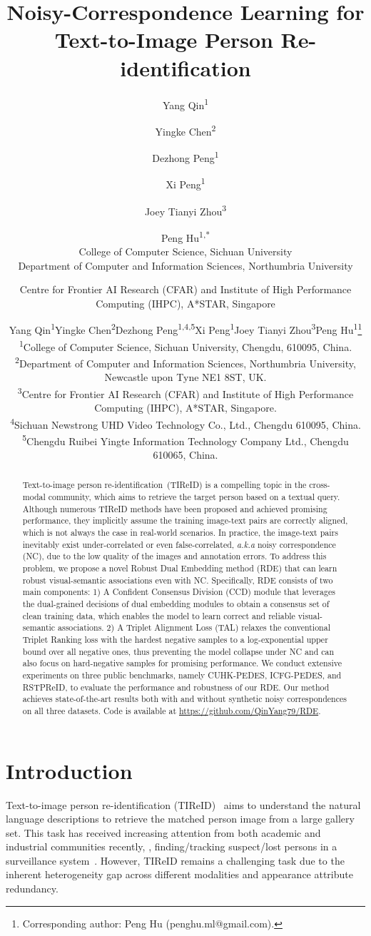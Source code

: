 \documentclass[10pt,twocolumn,letterpaper]{article}
\title{Noisy-Correspondence Learning for Text-to-Image Person Re-identification}
\author{Yang Qin\textsuperscript{\rm 1}\and Yingke Chen\textsuperscript{\rm 2}\and Dezhong Peng\textsuperscript{\rm 1}\and Xi Peng\textsuperscript{\rm 1}\and Joey Tianyi Zhou\textsuperscript{\rm 3}\and Peng Hu\textsuperscript{\rm 1,*}
\\
College of Computer Science, Sichuan University\\
Department of Computer and Information Sciences, Northumbria University\\
\and 
Centre for Frontier AI Research (CFAR) and Institute of High Performance Computing (IHPC), A*STAR, Singapore 
}
\author{
    Yang Qin\textsuperscript{\rm 1}\quad Yingke Chen\textsuperscript{\rm 2}\quad Dezhong Peng\textsuperscript{\rm 1,4,5}\quad Xi Peng\textsuperscript{\rm 1}\quad Joey Tianyi Zhou\textsuperscript{\rm 3}\quad Peng Hu\textsuperscript{\rm 1}\thanks{Corresponding author: Peng Hu (penghu.ml@gmail.com).} \\
    \textsuperscript{\rm 1}{\normalsize College of Computer Science, Sichuan University, Chengdu, 610095,  China.} 
    \\\textsuperscript{\rm 2}{\normalsize Department of Computer and Information Sciences, Northumbria University, Newcastle upon Tyne NE1 8ST, UK.} 
    \\  \textsuperscript{\rm 3}{\normalsize Centre for Frontier AI Research (CFAR) and Institute of High Performance Computing (IHPC), A*STAR, Singapore.}
     \\  \textsuperscript{\rm 4}{\normalsize Sichuan Newstrong UHD Video Technology Co., Ltd., Chengdu 610095, China.}
      \\  \textsuperscript{\rm 5}{\normalsize Chengdu Ruibei Yingte Information Technology Company Ltd., Chengdu 610065, China.}
}
\begin{document}
\maketitle

\begin{abstract}
    Text-to-image person re-identification~(TIReID) is a compelling topic in the cross-modal community, which aims to retrieve the target person based on a textual query. Although numerous TIReID methods have been proposed and achieved promising performance, they implicitly assume the training image-text pairs are correctly aligned, which is not always the case in real-world scenarios. In practice, the image-text pairs inevitably exist under-correlated or even false-correlated, \textit{a.k.a} noisy correspondence (NC), due to the low quality of the images and annotation errors. To address this problem, we propose a novel Robust Dual Embedding method (RDE) that can learn robust visual-semantic associations even with NC. Specifically, RDE consists of two main components: 1) A Confident Consensus Division (CCD) module that leverages the dual-grained decisions of dual embedding modules to obtain a consensus set of clean training data, which enables the model to learn correct and reliable visual-semantic associations. 2) A Triplet Alignment Loss (TAL) relaxes the conventional Triplet Ranking loss with the hardest negative samples to a log-exponential upper bound over all negative ones, thus preventing the model collapse under NC and can also focus on hard-negative samples for promising performance. We conduct extensive experiments on three public benchmarks, namely CUHK-PEDES, ICFG-PEDES, and RSTPReID, to evaluate the performance and robustness of our RDE. Our method achieves state-of-the-art results both with and without synthetic noisy correspondences on all three datasets.  Code is available at \href{https://github.com/QinYang79/RDE}{https://github.com/QinYang79/RDE}.
\end{abstract}


\section{Introduction}
\label{sec:intro}

Text-to-image person re-identification (TIReID)~\cite{li2017person,shu2022see,jiang2023cross} aims to understand the natural language descriptions to retrieve the matched person image from a large gallery set. This task has received increasing attention from both academic and industrial communities recently, \eg, finding/tracking suspect/lost persons in a surveillance system~\cite{wang2015multi,eom2019learning}. However, TIReID remains a challenging task due to the inherent heterogeneity gap across different modalities and appearance attribute redundancy.
\end{document}

